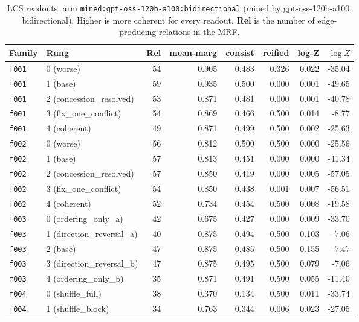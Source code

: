 \documentclass[11pt]{article}
\begin{document}
\begin{table}[htbp]
\centering
\small
\caption{LCS readouts, arm \texttt{mined:gpt-oss-120b-a100:bidirectional} (mined by gpt-oss-120b-a100, bidirectional). Higher is more coherent for every readout. \textbf{Rel} is the number of edge-producing relations in the MRF.}
\label{tab:scores-mined-gpt-oss-120b-a100-bidirectional}
\begin{tabular}{llrrrrrr}
\toprule
Family & Rung & Rel & \textbf{mean-marg} & \textbf{consist} & \textbf{reified} & \textbf{log-Z} & $\log Z$ \\
\midrule
\texttt{f001} & 0 (worse) & 54 & 0.905 & 0.483 & 0.326 & 0.022 & -35.04 \\
\texttt{f001} & 1 (base) & 59 & 0.935 & 0.500 & 0.000 & 0.001 & -49.65 \\
\texttt{f001} & 2 (concession\_resolved) & 53 & 0.871 & 0.481 & 0.000 & 0.001 & -40.78 \\
\texttt{f001} & 3 (fix\_one\_conflict) & 54 & 0.869 & 0.466 & 0.500 & 0.014 & -8.77 \\
\texttt{f001} & 4 (coherent) & 49 & 0.871 & 0.499 & 0.500 & 0.002 & -25.63 \\
\midrule
\texttt{f002} & 0 (worse) & 56 & 0.812 & 0.500 & 0.500 & 0.000 & -25.56 \\
\texttt{f002} & 1 (base) & 57 & 0.813 & 0.451 & 0.000 & 0.000 & -41.34 \\
\texttt{f002} & 2 (concession\_resolved) & 57 & 0.850 & 0.419 & 0.000 & 0.005 & -57.05 \\
\texttt{f002} & 3 (fix\_one\_conflict) & 54 & 0.850 & 0.438 & 0.001 & 0.007 & -56.51 \\
\texttt{f002} & 4 (coherent) & 52 & 0.734 & 0.454 & 0.500 & 0.008 & -19.58 \\
\midrule
\texttt{f003} & 0 (ordering\_only\_a) & 42 & 0.675 & 0.427 & 0.000 & 0.009 & -33.70 \\
\texttt{f003} & 1 (direction\_reversal\_a) & 40 & 0.875 & 0.494 & 0.500 & 0.103 & -7.06 \\
\texttt{f003} & 2 (base) & 47 & 0.875 & 0.485 & 0.500 & 0.155 & -7.47 \\
\texttt{f003} & 3 (direction\_reversal\_b) & 47 & 0.875 & 0.495 & 0.500 & 0.079 & -7.06 \\
\texttt{f003} & 4 (ordering\_only\_b) & 35 & 0.871 & 0.491 & 0.500 & 0.055 & -11.40 \\
\midrule
\texttt{f004} & 0 (shuffle\_full) & 38 & 0.370 & 0.134 & 0.500 & 0.011 & -33.74 \\
\texttt{f004} & 1 (shuffle\_block) & 34 & 0.763 & 0.344 & 0.006 & 0.023 & -27.05 \\

\end{tabular}
\end{table}
\end{document}
